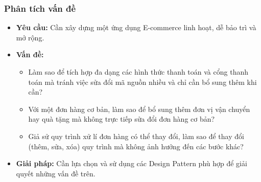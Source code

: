 \subsubsection{Phân tích vấn đề}
\begin{itemize}
  \item \textbf{Yêu cầu:} Cần xây dựng một ứng dụng E-commerce linh hoạt, dễ bảo trì và mở rộng.
  \item \textbf{Vấn đề:}
        \begin{itemize}
          \item Làm sao để tích hợp đa dạng các hình thức thanh toán và cổng thanh toán mà tránh việc sửa đổi mã nguồn nhiều và chỉ cần bổ sung thêm khi cần?
          \item Với một đơn hàng cơ bản, làm sao để bổ sung thêm đơn vị vận chuyển hay quà tặng mà không trực tiếp sửa đổi đơn hàng cơ bản?
          \item Giả sử quy trình xử lí đơn hàng có thể thay đổi, làm sao để thay đổi (thêm, sửa, xóa) quy trình mà không ảnh hưởng đến các bước khác?
        \end{itemize}
  \item \textbf{Giải pháp:} Cần lựa chọn và sử dụng các Design Pattern phù hợp để giải quyết những vấn đề trên.
\end{itemize}
